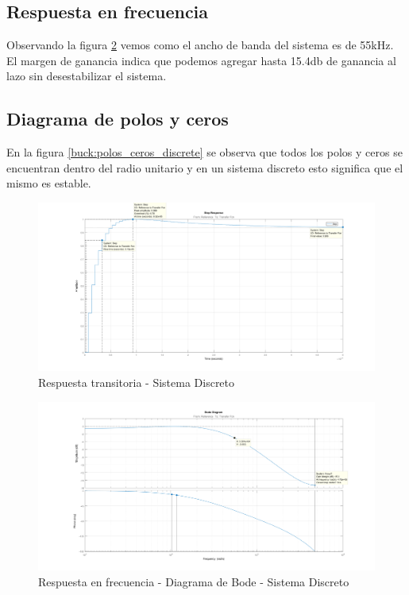 \documentclass[12pt]{report}
\begin{document}
	\subsection{Respuesta en frecuencia}
	
	Observando la figura \ref{buck:bode_discrete} vemos como el ancho de banda del sistema es de 55kHz. El margen de ganancia indica que podemos agregar hasta 15.4db de ganancia al lazo sin desestabilizar el sistema.
	
	\subsection{Diagrama de polos y ceros}
	
	En la figura \ref{buck:polos_ceros_discrete} se observa que todos los polos y ceros se encuentran dentro del radio unitario y en un sistema discreto esto significa que el mismo es estable.
	
	\begin{figure}
		\centering
		\includegraphics[width=\textwidth,height=\textheight,keepaspectratio]{buck_step_response_discrete} 
		\caption{Respuesta transitoria - Sistema Discreto}
		\label{buck:step_discrete}
	\end{figure}
	
	\begin{figure}
		\centering
		\includegraphics[width=\textwidth,height=\textheight,keepaspectratio]{buck_bode_discrete} 
		\caption{Respuesta en frecuencia - Diagrama de Bode - Sistema Discreto}
		\label{buck:bode_discrete}
	\end{figure}
	
\end{document}
